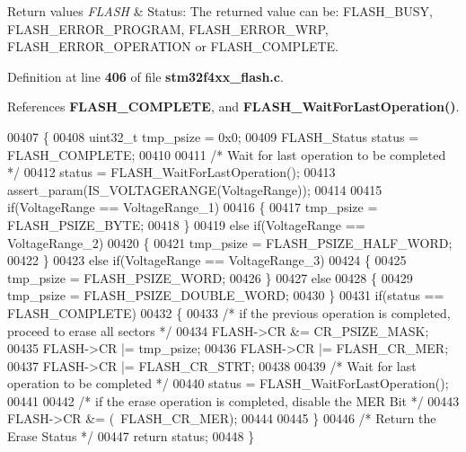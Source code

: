 \begin{DoxyRetVals}{Return values}
{\em F\+L\+A\+SH} & Status\+: The returned value can be\+: F\+L\+A\+S\+H\+\_\+\+B\+U\+SY, F\+L\+A\+S\+H\+\_\+\+E\+R\+R\+O\+R\+\_\+\+P\+R\+O\+G\+R\+AM, F\+L\+A\+S\+H\+\_\+\+E\+R\+R\+O\+R\+\_\+\+W\+RP, F\+L\+A\+S\+H\+\_\+\+E\+R\+R\+O\+R\+\_\+\+O\+P\+E\+R\+A\+T\+I\+ON or F\+L\+A\+S\+H\+\_\+\+C\+O\+M\+P\+L\+E\+TE. \\
\hline
\end{DoxyRetVals}


Definition at line \textbf{ 406} of file \textbf{ stm32f4xx\+\_\+flash.\+c}.



References \textbf{ F\+L\+A\+S\+H\+\_\+\+C\+O\+M\+P\+L\+E\+TE}, and \textbf{ F\+L\+A\+S\+H\+\_\+\+Wait\+For\+Last\+Operation()}.


\begin{DoxyCode}
00407 \{
00408   uint32\_t tmp\_psize = 0x0;
00409   FLASH_Status status = FLASH_COMPLETE;
00410   
00411   \textcolor{comment}{/* Wait for last operation to be completed */}
00412   status = FLASH_WaitForLastOperation();
00413   assert_param(IS_VOLTAGERANGE(VoltageRange));
00414   
00415   \textcolor{keywordflow}{if}(VoltageRange == VoltageRange_1)
00416   \{
00417      tmp\_psize = FLASH_PSIZE_BYTE;
00418   \}
00419   \textcolor{keywordflow}{else} \textcolor{keywordflow}{if}(VoltageRange == VoltageRange_2)
00420   \{
00421     tmp\_psize = FLASH_PSIZE_HALF_WORD;
00422   \}
00423   \textcolor{keywordflow}{else} \textcolor{keywordflow}{if}(VoltageRange == VoltageRange_3)
00424   \{
00425     tmp\_psize = FLASH_PSIZE_WORD;
00426   \}
00427   \textcolor{keywordflow}{else}
00428   \{
00429     tmp\_psize = FLASH_PSIZE_DOUBLE_WORD;
00430   \}  
00431   \textcolor{keywordflow}{if}(status == FLASH_COMPLETE)
00432   \{
00433     \textcolor{comment}{/* if the previous operation is completed, proceed to erase all sectors */}
00434      FLASH->CR &= CR_PSIZE_MASK;
00435      FLASH->CR |= tmp\_psize;
00436      FLASH->CR |= FLASH_CR_MER;
00437      FLASH->CR |= FLASH_CR_STRT;
00438     
00439     \textcolor{comment}{/* Wait for last operation to be completed */}
00440     status = FLASH_WaitForLastOperation();
00441 
00442     \textcolor{comment}{/* if the erase operation is completed, disable the MER Bit */}
00443     FLASH->CR &= (~FLASH_CR_MER);
00444 
00445   \}   
00446   \textcolor{comment}{/* Return the Erase Status */}
00447   \textcolor{keywordflow}{return} status;
00448 \}
\end{DoxyCode}
\mbox{\label{group__FLASH_ga48f408290b32a3aebbcad83a00fc447c}} 
